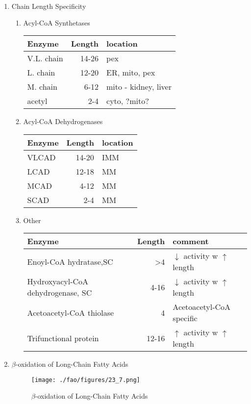 \documentclass{scrartcl}
\begin{document}
\begin{enumerate}
\item Chain Length Specificity
\label{sec:orgc8a82a2}

\begin{enumerate}
\item Acyl-CoA Synthetases
\label{sec:orgfcca442}

\begin{center}
\begin{tabular}{lrl}
Enzyme & Length & location\\
\hline
V.L. chain & 14-26 & pex\\
L. chain & 12-20 & ER, mito, pex\\
M. chain & 6-12 & mito - kidney, liver\\
acetyl & 2-4 & cyto, ?mito?\\
\end{tabular}
\end{center}


\item Acyl-CoA Dehydrogenases
\label{sec:orgc3e13e3}
\begin{center}
\begin{tabular}{lrl}
Enzyme & Length & location\\
\hline
VLCAD & 14-20 & IMM\\
LCAD & 12-18 & MM\\
MCAD & 4-12 & MM\\
SCAD & 2-4 & MM\\
\end{tabular}
\end{center}


\item Other
\label{sec:orgcdaddb2}
\begin{center}
\begin{tabular}{lrl}
Enzyme & Length & comment\\
\hline
Enoyl-CoA hydratase,SC & >4 & \(\downarrow\) activity w \(\uparrow\) length\\
Hydroxyacyl-CoA dehydrogenase, SC & 4-16 & \(\downarrow\) activity w \(\uparrow\) length\\
Acetoacetyl-CoA thiolase & 4 & Acetoacetyl-CoA specific\\
Trifunctional protein & 12-16 & \(\uparrow\) activity w \(\uparrow\) length\\
\end{tabular}
\end{center}
\end{enumerate}


\item \(\beta\)-oxidation of Long-Chain Fatty Acids
\label{sec:orge2ee0cb}
\begin{figure}[htbp]
\centering
\texttt{[image: ./fao/figures/23\_7.png]}
\caption{\label{fig:orgbe0275f}
\(\beta\)-oxidation of Long-Chain Fatty Acids}
\end{figure}


\end{enumerate}
\end{document}
